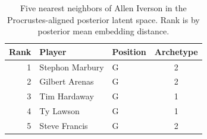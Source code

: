 \begin{table}[htbp]
  \centering\small
  \begin{tabular}{rllc}
    \toprule
    Rank & Player & Position & Archetype \\
    \midrule
    1 & Stephon Marbury & G & 2 \\
    2 & Gilbert Arenas & G & 2 \\
    3 & Tim Hardaway & G & 1 \\
    4 & Ty Lawson & G & 1 \\
    5 & Steve Francis & G & 2 \\
    \bottomrule
  \end{tabular}
  \caption{Five nearest neighbors of Allen Iverson in the Procrustes-aligned posterior latent space. Rank is by posterior mean embedding distance.}
  \label{tab:Allen_Iverson_neighbors}
\end{table}

